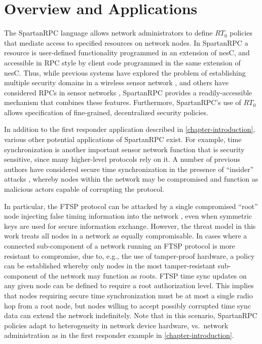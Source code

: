 \section{Overview and Applications}
\label{section-overview}

The SpartanRPC language allows network administrators to define $RT_0$ policies that mediate
access to specified resources on network nodes. In SpartanRPC a resource is user-defined
functionality programmed in an extension of nesC, and accessible in RPC style by client code
programmed in the same extension of nesC. Thus, while previous systems have explored the problem
of establishing multiple security domains in a wireless sensor network
\cite{Claycomb:2011:NNL:1889383.1889450}, and others have considered RPCs in sensor networks
\cite{may-tinyrpc-2007,bergstrom-anycastrpc-2007,5766863}, SpartanRPC provides a
readily-accessible mechanism that combines these features. Furthermore, SpartanRPC's use of
$RT_0$ allows specification of fine-grained, decentralized security policies.

In addition to the first responder application described in \autoref{chapter-introduction},
various other potential applications of SpartanRPC exist. For example, time synchronization is
another important sensor network function that is security sensitive, since many higher-level
protocols rely on it. A number of previous authors have considered secure time synchronization
in the presence of ``insider'' attacks
\cite{Manzo:2005:TSA:1102219.1102238,Ganeriwal:2008:STS:1380564.1380571}, whereby nodes within
the network may be compromised and function as malicious actors capable of corrupting the
protocol.

In particular, the FTSP protocol can be attacked by a single compromised ``root'' node injecting
false timing information into the network \cite{Manzo:2005:TSA:1102219.1102238}, even when
symmetric keys are used for secure information exchange. However, the threat model in this work
treats all nodes in a network as equally compromisable. In cases where a connected sub-component
of a network running an FTSP protocol is more resistant to compromise, due to, e.g., the use of
tamper-proof hardware, a policy can be established whereby only nodes in the most
tamper-resistant sub-component of the network may function as roots. FTSP time sync updates on
any given node can be defined to require a root authorization level. This implies that nodes
requiring secure time synchronization must be at most a single radio hop from a root node, but
nodes willing to accept possibly corrupted time sync data can extend the network indefinitely.
Note that in this scenario, SpartanRPC policies adapt to heterogeneity in network device
hardware, vs.~network administration as in the first responder example in
\autoref{chapter-introduction}.

